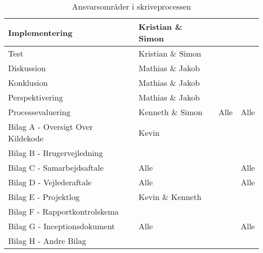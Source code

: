 \begin{table}[H]
\begin{tabularx}{\textwidth}{|>{\RaggedRight}p{7cm}|>{\RaggedRight}X|>{\RaggedRight}X|>{\RaggedRight}X|}
        \hline
        Implementering                      & Kristian \& Simon &  &  \\
        \hline
        Test                                & Kristian \& Simon &  &  \\
        \hline
        Diskussion                          & Mathias \& Jakob &  &  \\
        \hline
        Konklusion                          & Mathias \& Jakob &  &  \\
        \hline
        Perspektivering                     & Mathias \& Jakob &  &  \\
        \hline
        Processevaluering                   & Kenneth \& Simon & Alle & Alle \\
        \hline
        Bilag A - Oversigt Over Kildekode   & Kevin &  &  \\
        \hline
        Bilag B - Brugervejledning          &  &  &  \\
        \hline
        Bilag C - Samarbejdsaftale          & Alle &  & Alle\\
        \hline
        Bilag D - Vejlederaftale            & Alle &  & Alle\\
        \hline
        Bilag E - Projektlog                & Kevin \& Kenneth &  & \\
        \hline
        Bilag F - Rapportkontrolskema       &  &  &  \\
        \hline
        Bilag G - Inceptionsdokument        & Alle &  & Alle \\
        \hline
        Bilag H - Andre Bilag               &  &  &  \\
        \hline
    \end{tabularx}
    \caption{Ansvarsområder i skriveprocessen}
    \label{tab:redaktionelt}
\end{table}